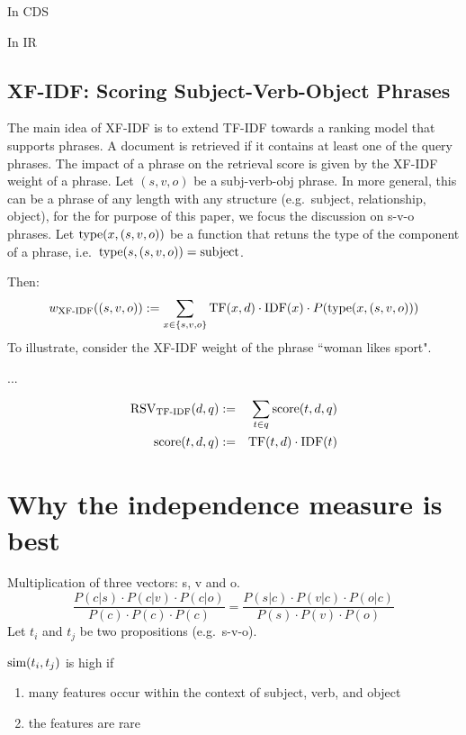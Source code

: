 In CDS


In IR


\subsection{XF-IDF: Scoring Subject-Verb-Object Phrases}

The main idea of XF-IDF \cite{Azzam/etal:SIGMOD:KEYS:2010} is to extend
TF-IDF towards a ranking model that supports phrases.
%
A document is retrieved if it contains at least one of the query phrases.
%
The impact of a phrase on the retrieval score is given by the XF-IDF
weight of a phrase.
%
Let $(s,v,o)$ be a subj-verb-obj phrase.
In more general, this can be a phrase of any length with any structure
(e.g.~subject, relationship, object), for the for purpose of this paper,
we focus the discussion on s-v-o phrases.
%
Let $\textmd{type}(x,(s,v,o))$ be a function that retuns the type of the component
of a phrase, i.e.~$\textmd{type}(s,(s,v,o))=\textmd{subject}$.

Then:
\[
w_\textmd{XF-IDF}((s,v,o)) :=
\sum_{x \in \{s,v,o\}} \textmd{TF}(x,d) \cdot \textmd{IDF}(x) \cdot P(\textmd{type}(x,(s,v,o)))
\]
To illustrate, consider the XF-IDF weight of the phrase ``woman likes sport".

...

\begin{eqnarray}
\label{tf-idf-phrase}
\textmd{RSV}_\textmd{TF-IDF}(d,q) &:=& \sum_{t \in q} \textmd{score}(t,d,q)\\
\textmd{score}(t,d,q) &:=&
\textmd{TF}(t,d) \cdot \textmd{IDF}(t)
\end{eqnarray}





\section{Why the independence measure is best}

Multiplication of three vectors: s, v and o.
\[
\frac{
P(c|s) \cdot P(c|v) \cdot P(c|o)}{
P(c) \cdot P(c) \cdot P(c)} =
\frac{
P(s|c) \cdot P(v|c) \cdot P(o|c)
}{
P(s) \cdot P(v) \cdot P(o)
}
\]
Let $t_i$ and $t_j$ be two propositions
(e.g.~s-v-o).

$\textmd{sim}(t_i,t_j)$ is high if
\begin{enumerate}
\item many features occur within the context of subject, verb, and object
\item the features are rare
\end{enumerate}

